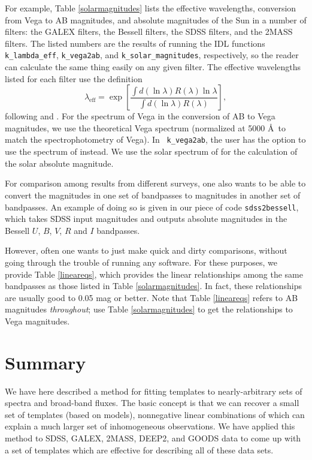 \documentclass[10pt,preprint]{aastex}
\begin{document}
For example, Table \ref{solarmagnitudes} lists the effective
wavelengths, conversion from Vega to AB magnitudes, and absolute
magnitudes of the Sun in a number of filters: the GALEX filters, the
Bessell filters, the SDSS filters, and the 2MASS filters. The listed
numbers are the results of running the IDL functions {\tt
k\_lambda\_eff}, {\tt k\_vega2ab}, and {\tt k\_solar\_magnitudes},
respectively, so the reader can calculate the same thing easily on any
given filter.  The effective wavelengths listed for each filter use
the definition
\begin{equation}
\label{lden}
\lambda_{\mathrm{eff}} = \exp\left[ 
\frac{\int d(\ln\lambda) R(\lambda) \ln\lambda}
{\int d(\ln\lambda) R(\lambda)} \right],
\end{equation}
following \citet{fukugita96a} and \citet{schneider83a}.  For the
spectrum of Vega in the conversion of AB to Vega magnitudes, we use
the \citet{kurucz91a} theoretical Vega spectrum (normalized at 5000
\AA\ to match the \citet{hayes85a} spectrophotometry of Vega). In {\tt
k\_vega2ab}, the user has the option to use the spectrum of
\citet{hayes85a} instead.  We use the solar spectrum of
\citet{kurucz91a} for the calculation of the solar absolute magnitude.

For comparison among results from different surveys, one also wants to
be able to convert the magnitudes in one set of bandpasses to
magnitudes in another set of bandpasses. An example of doing so is
given in our piece of code {\tt sdss2bessell}, which takes SDSS input
magnitudes and outputs absolute magnitudes in the Bessell $U$, $B$,
$V$, $R$ and $I$ bandpasses. 

However, often one wants to just make quick and dirty comparisons,
without going through the trouble of running any software. For these
purposes, we provide Table \ref{lineareqs}, which provides the linear
relationships among the same bandpasses as those listed in Table
\ref{solarmagnitudes}. In fact, these relationships are usually good
to 0.05 mag or better. Note that Table \ref{lineareqs} refers to AB
magnitudes {\it throughout}; use Table \ref{solarmagnitudes} to get
the relationships to Vega magnitudes.

\section{Summary}
\label{summary}

We have here described a method for fitting templates to
nearly-arbitrary sets of spectra and broad-band fluxes. The basic
concept is that we can recover a small set of templates (based on
models), nonnegative linear combinations of which can explain a much
larger set of inhomogeneous observations.  We have applied this method
to SDSS, GALEX, 2MASS, DEEP2, and GOODS data to come up with a set of
templates which are effective for describing all of these data sets.
\end{document}
